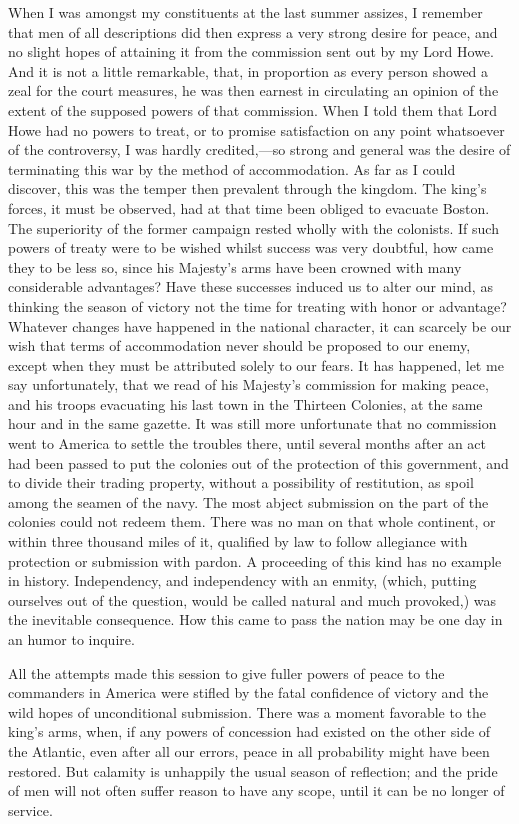 When I was amongst my constituents at the last summer assizes, I remember that men of all descriptions did then express a very strong desire for peace, and no slight hopes of attaining it from the commission sent out by my Lord Howe. And it is not a little remarkable, that, in proportion as every person showed a zeal for the court measures, he was then earnest in circulating an opinion of the extent of the supposed powers of that commission. When I told them that Lord Howe had no powers to treat, or to promise satisfaction on any point whatsoever of the controversy, I was hardly credited,—so strong and general was the desire of terminating this war by the method of accommodation. As far as I could discover, this was the temper then prevalent through the kingdom. The king's forces, it must be observed, had at that time been obliged to evacuate Boston. The superiority of the former campaign rested wholly with the colonists. If such powers of treaty were to be wished whilst success was very doubtful, how came they to be less so, since his Majesty's arms have been crowned with many considerable advantages? Have these successes induced us to alter our mind, as thinking the season of victory not the time for treating with honor or advantage? Whatever changes have happened in the national character, it can scarcely be our wish that terms of accommodation never should be proposed to our enemy, except when they must be attributed solely to our fears. It has happened, let me say unfortunately, that we read of his Majesty's commission for making peace, and his troops evacuating his last town in the Thirteen Colonies, at the same hour and in the same gazette. It was still more unfortunate that no commission went to America to settle the troubles there, until several months after an act had been passed to put the colonies out of the protection of this government, and to divide their trading property, without a possibility of restitution, as spoil among the seamen of the navy. The most abject submission on the part of the colonies could not redeem them. There was no man on that whole continent, or within three thousand miles of it, qualified by law to follow allegiance with protection or submission with pardon. A proceeding of this kind has no example in history. Independency, and independency with an enmity, (which, putting ourselves out of the question, would be called natural and much provoked,) was the inevitable consequence. How this came to pass the nation may be one day in an humor to inquire.

All the attempts made this session to give fuller powers of peace to the commanders in America were stifled by the fatal confidence of victory and the wild hopes of unconditional submission. There was a moment favorable to the king's arms, when, if any powers of concession had existed on the other side of the Atlantic, even after all our errors, peace in all probability might have been restored. But calamity is unhappily the usual season of reflection; and the pride of men will not often suffer reason to have any scope, until it can be no longer of service.

